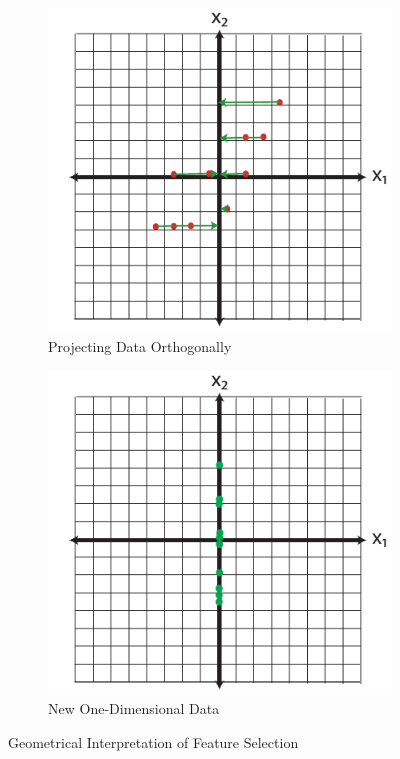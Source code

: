 \documentclass[
]{article}
\theoremstyle{definition}
\theoremstyle{definition}
\theoremstyle{definition}
\theoremstyle{definition}
\theoremstyle{remark}
\begin{document}
\begin{figure}[h!]
\centering
\begin{subfigure}[b]{0.45\textwidth}
\includegraphics[width=\textwidth]{figs/pcpointsselect1.pdf}
\caption{Projecting Data Orthogonally}
\label{select1}
\end{subfigure}
\begin{subfigure}[b]{0.45\textwidth}
\includegraphics[width=\textwidth]{figs/pcpointsselect2.pdf}
\caption{New One-Dimensional Data}
\label{select2}
\end{subfigure}
\caption{Geometrical Interpretation of Feature Selection}
\end{figure}
\end{document}

